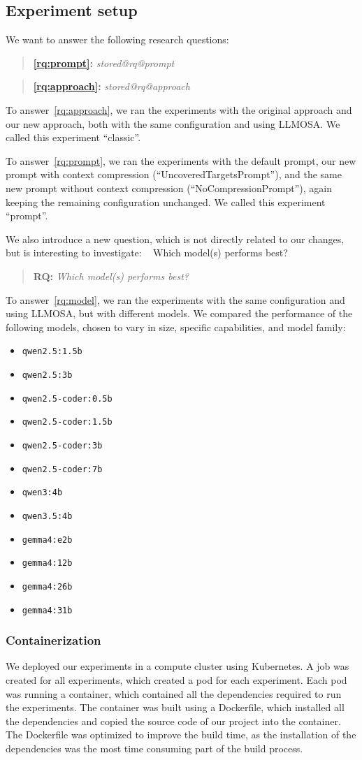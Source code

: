 \documentclass{article}
\makeatletter
\newcounter{rqcnt} %
\renewcommand{\therqcnt}{RQ\arabic{rqcnt}} %
\newcommand{\formatRQ}[2]{
    \begin{quote}
        \textbf{#1:} \textit{#2}
    \end{quote}
}
\newcommand{\RQ}[2]{ %
~\refstepcounter{rqcnt}\label{rq:#1} %
    \expandafter\gdef\csname stored@rq@#1\endcsname{#2} %
    \formatRQ{\therqcnt}{#2}
}
\newcommand{\printRQ}[1]{ %
    \formatRQ{\ref{rq:#1}}{\csname stored@rq@#1\endcsname} %
}
\makeatother
\begin{document}
\subsection{Experiment setup}
We want to answer the following research questions:
\printRQ{prompt}
\printRQ{approach}

To answer~\ref{rq:approach}, we ran the experiments with the original approach and our new approach, both with the same configuration and using LLMOSA. We called this experiment ``classic''.

To answer~\ref{rq:prompt}, we ran the experiments with the default prompt, our new prompt with context compression (``UncoveredTargetsPrompt''), and the same new prompt without context compression (``NoCompressionPrompt''), again keeping the remaining configuration unchanged. We called this experiment ``prompt''.

We also introduce a new question, which is not directly related to our changes, but is interesting to investigate: \RQ{model}{Which model(s) performs best?}
To answer~\ref{rq:model}, we ran the experiments with the same configuration and using LLMOSA, but with different models. We compared the performance of the following models, chosen to vary in size, specific capabilities, and model family:
\begin{itemize}
    \item \texttt{qwen2.5:1.5b}
    \item \texttt{qwen2.5:3b}
    \item \texttt{qwen2.5-coder:0.5b}
    \item \texttt{qwen2.5-coder:1.5b}
    \item \texttt{qwen2.5-coder:3b}
    \item \texttt{qwen2.5-coder:7b}
    \item \texttt{qwen3:4b}
    \item \texttt{qwen3.5:4b}
    \item \texttt{gemma4:e2b}
    \item \texttt{gemma4:12b}
    \item \texttt{gemma4:26b}
    \item \texttt{gemma4:31b}
\end{itemize}

\subsubsection{Containerization}
We deployed our experiments in a compute cluster using Kubernetes. A job was created for all experiments, which created a pod for each experiment. Each pod was running a container, which contained all the dependencies required to run the experiments. The container was built using a Dockerfile, which installed all the dependencies and copied the source code of our project into the container. The Dockerfile was optimized to improve the build time, as the installation of the dependencies was the most time consuming part of the build process.
\end{document}
